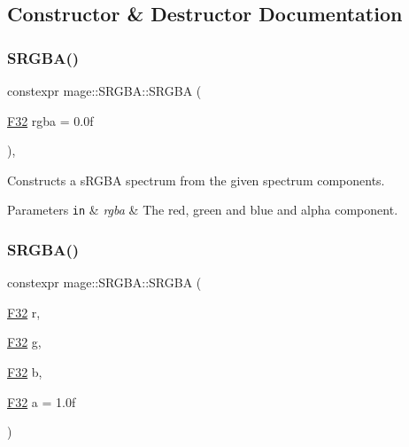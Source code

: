 \subsection{Constructor \& Destructor Documentation}
\mbox{\label{structmage_1_1_s_r_g_b_a_ab2d736d077534d550020b0f01e5780ae}} 
\subsubsection{\texorpdfstring{S\+R\+G\+B\+A()}{SRGBA()}\hspace{0.1cm}{\footnotesize\ttfamily [1/7]}}
{\footnotesize\ttfamily constexpr mage\+::\+S\+R\+G\+B\+A\+::\+S\+R\+G\+BA (\begin{DoxyParamCaption}\item[{\mbox{\hyperlink{namespacemage_aa97e833b45f06d60a0a9c4fc22ae02c0}{F32}}}]{rgba = {\ttfamily 0.0f} }\end{DoxyParamCaption})\hspace{0.3cm}{\ttfamily [explicit]}, {\ttfamily [noexcept]}}

Constructs a s\+R\+G\+BA spectrum from the given spectrum components.


\begin{DoxyParams}[1]{Parameters}
\mbox{\tt in}  & {\em rgba} & The red, green and blue and alpha component. \\
\hline
\end{DoxyParams}
\mbox{\label{structmage_1_1_s_r_g_b_a_a159096e69a7e18eee0d6718d244a1493}} 
\subsubsection{\texorpdfstring{S\+R\+G\+B\+A()}{SRGBA()}\hspace{0.1cm}{\footnotesize\ttfamily [2/7]}}
{\footnotesize\ttfamily constexpr mage\+::\+S\+R\+G\+B\+A\+::\+S\+R\+G\+BA (\begin{DoxyParamCaption}\item[{\mbox{\hyperlink{namespacemage_aa97e833b45f06d60a0a9c4fc22ae02c0}{F32}}}]{r,  }\item[{\mbox{\hyperlink{namespacemage_aa97e833b45f06d60a0a9c4fc22ae02c0}{F32}}}]{g,  }\item[{\mbox{\hyperlink{namespacemage_aa97e833b45f06d60a0a9c4fc22ae02c0}{F32}}}]{b,  }\item[{\mbox{\hyperlink{namespacemage_aa97e833b45f06d60a0a9c4fc22ae02c0}{F32}}}]{a = {\ttfamily 1.0f} }\end{DoxyParamCaption})\hspace{0.3cm}{\ttfamily [noexcept]}}

